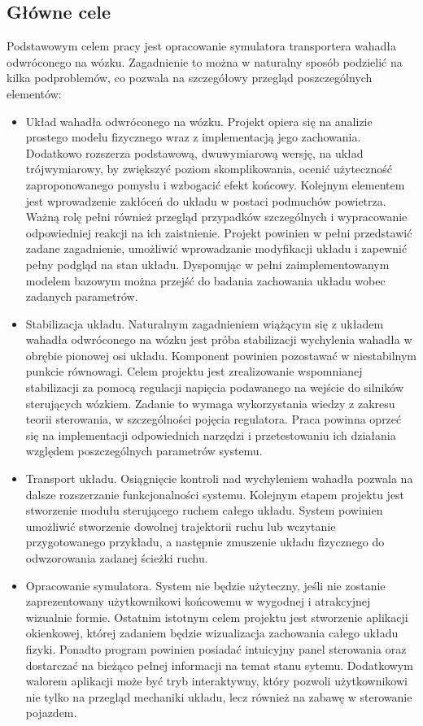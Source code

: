 \documentclass[12pt, twoside, openany]{report}
\theoremstyle{definition}
\begin{document}
\subsection{Główne cele}
Podstawowym celem pracy jest opracowanie symulatora transportera wahadła odwróconego na wózku. Zagadnienie to można w naturalny sposób podzielić na kilka podproblemów, co pozwala na szczegółowy przegląd poszczególnych elementów:
\begin{itemize}
\item Układ wahadła odwróconego na wózku. Projekt opiera się na analizie prostego modelu fizycznego wraz z implementacją jego zachowania. Dodatkowo rozszerza podstawową, dwuwymiarową wersję, na układ trójwymiarowy, by zwiększyć poziom skomplikowania, ocenić użyteczność zaproponowanego pomysłu i wzbogacić efekt końcowy. Kolejnym elementem jest wprowadzenie zakłóceń do układu w postaci podmuchów powietrza. Ważną rolę pełni również przegląd przypadków szczególnych i wypracowanie odpowiedniej reakcji na ich zaistnienie. Projekt powinien w pełni przedstawić zadane zagadnienie, umożliwić wprowadzanie modyfikacji układu i zapewnić pełny podgląd na stan układu. Dysponując w pełni zaimplementowanym modelem bazowym można przejść do badania zachowania układu wobec zadanych parametrów.
\item Stabilizacja układu. Naturalnym zagadnieniem wiążącym się z układem wahadła odwróconego na wózku jest próba stabilizacji wychylenia wahadła w obrębie pionowej osi układu. Komponent powinien pozostawać w niestabilnym punkcie równowagi. Celem projektu jest zrealizowanie wspomnianej stabilizacji za pomocą regulacji napięcia podawanego na wejście do silników sterujących wózkiem. Zadanie to wymaga wykorzystania wiedzy z zakresu teorii sterowania, w szczególności pojęcia regulatora. Praca powinna oprzeć się na implementacji odpowiednich narzędzi i przetestowaniu ich działania względem poszczególnych parametrów systemu. 
\item Transport układu. Osiągnięcie kontroli nad wychyleniem wahadła pozwala na dalsze rozszerzanie funkcjonalności systemu. Kolejnym etapem projektu jest stworzenie modułu sterującego ruchem całego układu. System powinien umożliwić stworzenie dowolnej trajektorii ruchu lub wczytanie przygotowanego przykładu, a następnie zmuszenie układu fizycznego do odwzorowania zadanej ścieżki ruchu.
\item Opracowanie symulatora. System nie będzie użyteczny, jeśli nie zostanie zaprezentowany użytkownikowi końcowemu w wygodnej i atrakcyjnej wizualnie formie. Ostatnim istotnym celem projektu jest stworzenie aplikacji okienkowej, której zadaniem będzie wizualizacja zachowania całego układu fizyki. Ponadto program powinien posiadać intuicyjny panel sterowania oraz dostarczać na bieżąco pełnej informacji na temat stanu sytemu. Dodatkowym walorem aplikacji może być tryb interaktywny, który pozwoli użytkownikowi nie tylko na przegląd mechaniki układu, lecz również na zabawę w sterowanie pojazdem.
\end{itemize}
\end{document}
